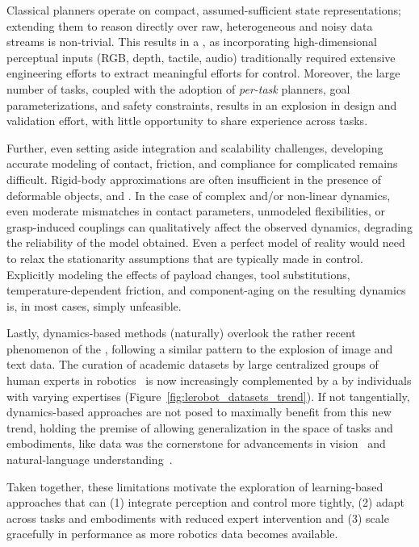 Classical planners operate on compact, assumed-sufficient state representations; extending them to reason directly over raw, heterogeneous and noisy data streams is non-trivial.
This results in a , as incorporating high-dimensional perceptual inputs (RGB, depth, tactile, audio) traditionally required extensive engineering efforts to extract meaningful efforts for control. 
Moreover, the large number of tasks, coupled with the adoption of \emph{per-task} planners, goal parameterizations, and safety constraints, results in an explosion in design and validation effort, with little opportunity to share experience across tasks.

Further, even setting aside integration and scalability challenges, developing accurate modeling of contact, friction, and compliance for complicated remains difficult.
Rigid-body approximations are often insufficient in the presence of deformable objects, and .
In the case of complex and/or non-linear dynamics, even moderate mismatches in contact parameters, unmodeled flexibilities, or grasp-induced couplings can qualitatively affect the observed dynamics, degrading the reliability of  the model obtained.
Even a perfect model of reality would need to relax the stationarity assumptions that are typically made in control. Explicitly modeling the effects of payload changes, tool substitutions, temperature-dependent friction, and component-aging on the resulting dynamics is, in most cases, simply unfeasible.

Lastly, dynamics-based methods (naturally) overlook the rather recent phenomenon of the , following a similar pattern to the explosion of image and text data.
The curation of academic datasets by large centralized groups of human experts in robotics~\citep{OpenXEmbodimentRobotic,DROIDLargeScaleIntheWild,agibot-world-contributorsAgiBotWorldColosseo2025} is now increasingly complemented by a  by individuals with varying expertises (Figure~\ref{fig:lerobot_datasets_trend}).
If not tangentially, dynamics-based approaches are not posed to maximally benefit from this new trend, holding the premise of allowing generalization in the space of tasks and embodiments, like data was the cornerstone for advancements in vision~\citep{alayracFlamingoVisualLanguage2022} and natural-language understanding~\citep{openaiGPT4TechnicalReport2024}.

Taken together, these limitations motivate the exploration of learning-based approaches that can (1) integrate perception and control more tightly, (2) adapt across tasks and embodiments with reduced expert intervention and (3) scale gracefully in performance as more robotics data becomes available.